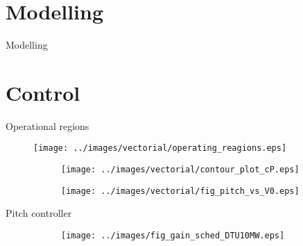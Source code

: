 \section{Modelling}
\begin{frame}{Modelling}
  
\end{frame}

                                   
\section{Control}
\begin{frame}{Operational regions}

  \begin{figure}[H]
    \centering
    \texttt{[image: ../images/vectorial/operating\_reagions.eps]}
  \end{figure}

  \begin{figure}
    \centering
    \begin{subfigure}{0.49\textwidth}
      \centering
      \texttt{[image: ../images/vectorial/contour\_plot\_cP.eps]}
    \end{subfigure}
    \begin{subfigure}{0.49\textwidth}
      \centering
      \texttt{[image: ../images/vectorial/fig\_pitch\_vs\_V0.eps]}
    \end{subfigure}
  \end{figure}

\end{frame}

\begin{frame}{Pitch controller}
  \begin{figure}
    \centering
    \begin{subfigure}{\columnwidth}
      \centering
      \begingroup
        
      \endgroup
    \end{subfigure} 

    \begin{subfigure}{0.49\textwidth}
      \centering
      \texttt{[image: ../images/fig\_gain\_sched\_DTU10MW.eps]}
    \end{subfigure}
  \end{figure}

\end{frame}

